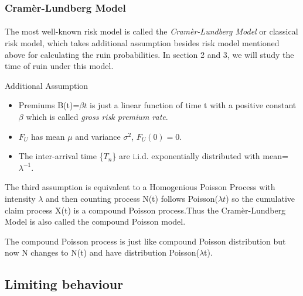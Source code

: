 \documentclass[project2.tex]{subfiles}
\begin{document}
\subsubsection{Cram\`er-Lundberg Model}
\paragraph{}
The most well-known risk model is called the {\it Cram\`er-Lundberg Model} or classical risk model, which takes additional assumption besides risk model mentioned above for calculating the ruin probabilities. In section 2 and 3, we will study the time of ruin under this model.
\begin{definition}
Additional Assumption
\end{definition}
\begin{itemize}
\item Premiums B(t)=$\beta t$ is just a linear function of time t with a positive constant $\beta$ which is called {\it gross risk premium rate}.
\item $F_U$ has mean $\mu$ and variance $\sigma^2$,  $F_U(0)=0$.
\item The inter-arrival time \{$T_n$\} are i.i.d. exponentially distributed with mean=$\lambda^{-1}$.
\end{itemize}
\begin{observation}
The third assumption is equivalent to a Homogenious Poisson Process with intensity $\lambda$ and then counting process N(t) follows Poisson($\lambda t$) so the cumulative claim process X(t) is a compound Poisson process.Thus the Cram\`er-Lundberg Model is also called the compound Poisson model.
\end{observation}
\begin{remark}
The compound Poisson process is just like compound Poisson distribution but now N changes to N(t) and have distribution Poisson($\lambda$t).
\end{remark}
\subsection{Limiting behaviour}
\end{document}
